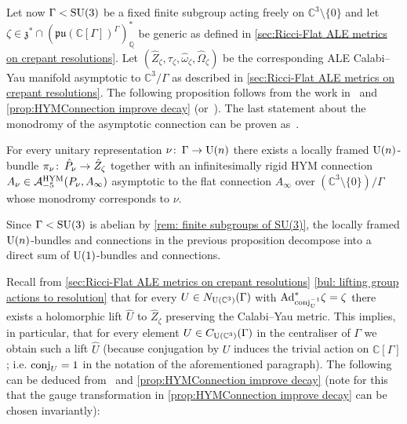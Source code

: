 \documentclass[11pt,a4paper]{scrartcl}
\newcommand{\col}{\colon \thinspace}
\newcommand{\Ad}{\textup{Ad}}
\newcommand{\SU}{\textup{SU}}
\newcommand{\U}{\textup{U}}
\numberwithin{equation}{section}
\theoremstyle{plain}
\theoremstyle{definition}
\theoremstyle{remark}
\begin{document}
Let now $\Gamma<\SU(3)$ be a fixed finite subgroup acting freely on $\mathbb{C}^3\setminus\{0\}$ and let $\zeta \in \mathfrak{z}^* \cap (\mathfrak{pu}(\mathbb{C}[\Gamma])^\Gamma)^*_\mathbb{Q}$ be generic as defined in \autoref{sec:Ricci-Flat ALE metrics on crepant resolutions}. Let $(\hat{Z}_\zeta,\tau_\zeta,\hat{\omega}_\zeta,\hat{\Omega}_\zeta)$ be the corresponding ALE Calabi--Yau manifold asymptotic to $\mathbb{C}^3/\Gamma$ as described in \autoref{sec:Ricci-Flat ALE metrics on crepant resolutions}. The following proposition follows from the work 
in~\cite{WalpuskiDegeratu-HYM_on_crepant_resolutions} and \autoref{prop:HYMConnection improve decay} (or~\cite[Remark~4.8]{WalpuskiDegeratu-HYM_on_crepant_resolutions}). The last statement about the monodromy of the asymptotic connection can be proven as~\cite[Proposition~2.2 (ii)]{KronheimerNakajima-YangMillsInstantons_on_ALE}.
\begin{proposition}\label{prop:irred_HYM_on_tautological_bundles}
For every unitary representation $\nu \col \Gamma \to \U(n)$ there exists a locally framed $\U(n)$-bundle $\pi_\nu \col \hat{P}_\nu \to \hat{Z}_\zeta$ together with an infinitesimally rigid HYM connection $A_\nu \in \mathcal{A}_{-5}^{\textup{HYM}}(P_\nu,A_\infty)$ asymptotic to the flat connection $A_\infty$ over $(\mathbb{C}^3\setminus\{0\})/\Gamma$ whose monodromy corresponds to $\nu$.
\end{proposition} 
\begin{remark}
Since $\Gamma<\SU(3)$ is abelian by \autoref{rem: finite subgroups of SU(3)}, the locally framed $\U(n)$-bundles and connections in the previous proposition decompose into a direct sum of $\U(1)$-bundles and connections.
\end{remark}
Recall from \autoref{sec:Ricci-Flat ALE metrics on crepant resolutions} \autoref{bul: lifting group actions to resolution} that for every $U\in N_{\U(\mathbb{C}^3)}(\Gamma)$ with $\Ad_{\textup{conj}_{U}^{-1}}^*\zeta = \zeta$ there exists a holomorphic lift $\hat{U}$ to $\hat{Z}_\zeta$ preserving the Calabi--Yau metric. This implies, in particular, that for every element $U\in C_{\U(\mathbb{C}^3)}(\Gamma)$ in the centraliser of $\Gamma$ we obtain such a lift $\hat{U}$ (because conjugation by $U$ induces the trivial action on $\mathbb{C}[\Gamma]$; i.e. $\textup{conj}_{U} = 1$ in the notation of the aforementioned paragraph). The following can be deduced from~\cite[Sections~3 and~4]{WalpuskiDegeratu-HYM_on_crepant_resolutions} and \autoref{prop:HYMConnection improve decay} (note for this that the gauge transformation in \autoref{prop:HYMConnection improve decay} can be chosen invariantly):
\end{document}
